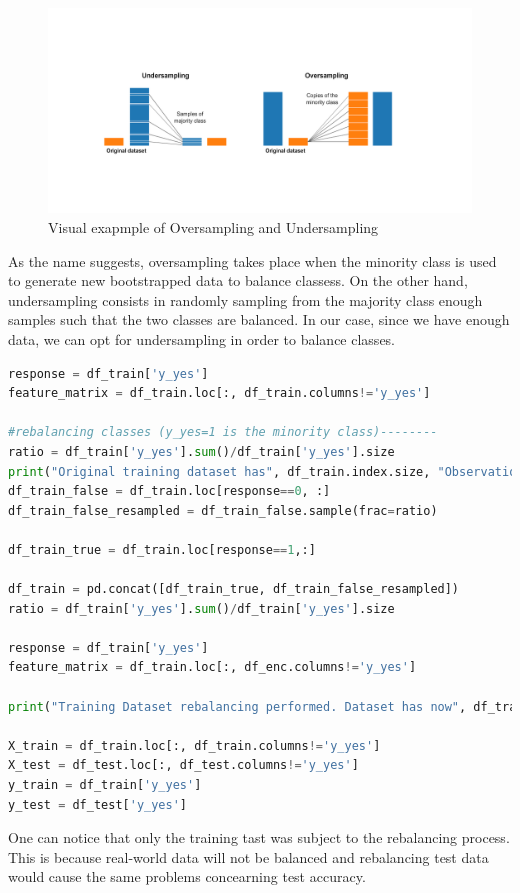 \begin{figure}[H]
    \centering
    \includegraphics[scale=0.4]{pictures/undersampling-oversampling.png}

    \caption*{Visual exapmple of Oversampling and Undersampling}
\end{figure}
As the name suggests, oversampling takes place when the minority class is used to generate new bootstrapped data to balance classess. On the other hand, undersampling consists in randomly sampling from the majority class enough samples such that the two classes are balanced. In our case, since we have enough data, we can opt for undersampling in order to balance classes.

\begin{lstlisting}[language=Python, caption= Data rebalancing]
response = df_train['y_yes']
feature_matrix = df_train.loc[:, df_train.columns!='y_yes']

#rebalancing classes (y_yes=1 is the minority class)--------
ratio = df_train['y_yes'].sum()/df_train['y_yes'].size
print("Original training dataset has", df_train.index.size, "Observations. \n", "Among them", response.sum(), "are positive and", response.size-response.sum(), "are negative \n Performing dataset rebalancing by undersampling... \n\n" )
df_train_false = df_train.loc[response==0, :]
df_train_false_resampled = df_train_false.sample(frac=ratio)

df_train_true = df_train.loc[response==1,:]

df_train = pd.concat([df_train_true, df_train_false_resampled])
ratio = df_train['y_yes'].sum()/df_train['y_yes'].size

response = df_train['y_yes']
feature_matrix = df_train.loc[:, df_enc.columns!='y_yes']

print("Training Dataset rebalancing performed. Dataset has now", df_train.index.size, "Observations. \n", "Among them", response.sum(), "are positive and", response.size-response.sum(), "are negative \n\n" )

X_train = df_train.loc[:, df_train.columns!='y_yes']
X_test = df_test.loc[:, df_test.columns!='y_yes']
y_train = df_train['y_yes']
y_test = df_test['y_yes']

\end{lstlisting}
One can notice that only the training tast was subject to the rebalancing process. This is because real-world data will not be balanced and rebalancing test data would cause the same problems concearning test accuracy.

